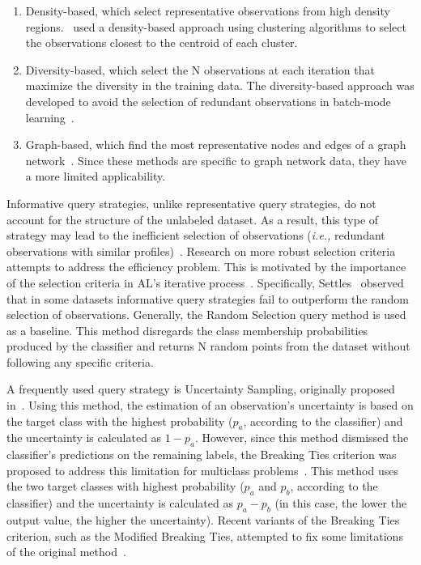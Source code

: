 \begin{enumerate}
    \item Density-based, which select representative observations from high
        density regions.~\cite{Huang2014, Li2012, Ienco2013} used a
        density-based approach using clustering algorithms to select the
        observations closest to the centroid of each cluster. 
    \item Diversity-based, which select the N observations at each iteration
        that maximize the diversity in the training data. The diversity-based
        approach was developed to avoid the selection of redundant
        observations in batch-mode learning~\cite{Brinker2003}.
    \item Graph-based, which find the most representative nodes and edges of a
        graph network~\cite{Jia2019}. Since these methods are specific to
        graph network data, they have a more limited applicability.
\end{enumerate}

Informative query strategies, unlike representative query strategies, do not
account for the structure of the unlabeled dataset. As a result, this type of
strategy may lead to the inefficient selection of observations (\textit{i.e.,}
redundant observations with similar profiles)~\cite{Kumar2020}. Research on
more robust selection criteria attempts to address the efficiency problem.
This is motivated by the importance of the selection criteria in AL's
iterative process~\cite{Rosario2020}. Specifically, Settles~\cite{Settles2011}
observed that in some datasets informative query strategies fail to outperform
the random selection of observations. Generally, the Random Selection query
method is used as a baseline. This method disregards the class membership
probabilities produced by the classifier and returns N random points from the
dataset without following any specific criteria.

A frequently used query strategy is Uncertainty Sampling, originally proposed
in~\cite{Lewis1994}. Using this method, the estimation of an observation's
uncertainty is based on the target class with the highest probability ($p_a$,
according to the classifier) and the uncertainty is calculated as $1-p_a$.
However, since this method dismissed the classifier's predictions on the
remaining labels, the Breaking Ties criterion was proposed to address this
limitation for multiclass problems~\cite{Luo2005}. This method uses the two
target classes with highest probability ($p_a$ and $p_b$, according to the
classifier) and the uncertainty is calculated as $p_a - p_b$ (in this case,
the lower the output value, the higher the uncertainty). Recent variants of
the Breaking Ties criterion, such as the Modified Breaking Ties, attempted to
fix some limitations of the original method~\cite{Liu2018, Li2012a}.


